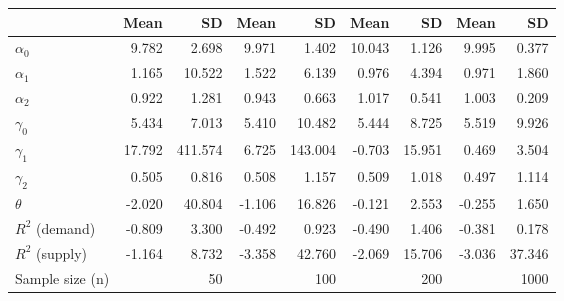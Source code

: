 
\begin{tabular}[t]{lrrrrrrrr}
\toprule
  & Mean & SD & Mean  & SD  & Mean   & SD   & Mean    & SD   \\
\midrule
$\alpha_{0}$ & 9.782 & 2.698 & 9.971 & 1.402 & 10.043 & 1.126 & 9.995 & 0.377\\
$\alpha_{1}$ & 1.165 & 10.522 & 1.522 & 6.139 & 0.976 & 4.394 & 0.971 & 1.860\\
$\alpha_{2}$ & 0.922 & 1.281 & 0.943 & 0.663 & 1.017 & 0.541 & 1.003 & 0.209\\
$\gamma_{0}$ & 5.434 & 7.013 & 5.410 & 10.482 & 5.444 & 8.725 & 5.519 & 9.926\\
$\gamma_{1}$ & 17.792 & 411.574 & 6.725 & 143.004 & -0.703 & 15.951 & 0.469 & 3.504\\
$\gamma_{2}$ & 0.505 & 0.816 & 0.508 & 1.157 & 0.509 & 1.018 & 0.497 & 1.114\\
$\theta$ & -2.020 & 40.804 & -1.106 & 16.826 & -0.121 & 2.553 & -0.255 & 1.650\\
$R^{2}$ (demand) & -0.809 & 3.300 & -0.492 & 0.923 & -0.490 & 1.406 & -0.381 & 0.178\\
$R^{2}$ (supply) & -1.164 & 8.732 & -3.358 & 42.760 & -2.069 & 15.706 & -3.036 & 37.346\\
Sample size (n) &  & 50 &  & 100 &  & 200 &  & 1000\\
\bottomrule
\end{tabular}
